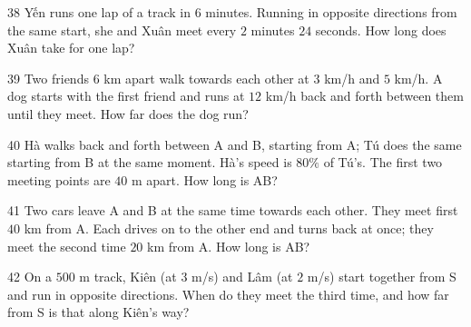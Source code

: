 \begin{probbox}{38}{}
Yến runs one lap of a track in $6$ minutes. Running in opposite directions from the same start, she and Xuân meet every $2$ minutes $24$ seconds. How long does Xuân take for one lap?
\end{probbox}
\gap
\begin{probbox}{39}{}
Two friends $6$ km apart walk towards each other at $3$ km/h and $5$ km/h. A dog starts with the first friend and runs at $12$ km/h back and forth between them until they meet. How far does the dog run?
\end{probbox}
\gap
\begin{probbox}{40}{}
Hà walks back and forth between A and B, starting from A; Tú does the same starting from B at the same moment. Hà's speed is $80\%$ of Tú's. The first two meeting points are $40$ m apart. How long is AB?
\end{probbox}
\gap
\begin{probbox}{41}{}
Two cars leave A and B at the same time towards each other. They meet first $40$ km from A. Each drives on to the other end and turns back at once; they meet the second time $20$ km from A. How long is AB?
\end{probbox}
\gap
\begin{probbox}{42}{}
On a $500$ m track, Kiên (at $3$ m/s) and Lâm (at $2$ m/s) start together from S and run in opposite directions. When do they meet the third time, and how far from S is that along Kiên's way?
\end{probbox}
